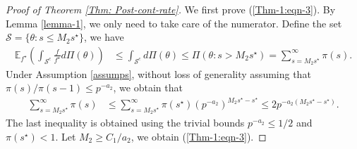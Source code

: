 \documentclass[pdftex, noinfoline, letter]{imsart}
\theoremstyle{plain}
\begin{document}
\begin{proof}[Proof of Theorem \ref{Thm: Post-cont-rate}]
We first prove (\ref{Thm-1:eqn-3}).
By Lemma \ref{lemma-1}, we only need to take care of the numerator.
Define the set $\mathcal{S} = \{\theta: s \leq M_2s^\star\}$,
we have
\begin{align*}
    \mathbb{E}_{f^\star} \left(
        \int_{\mathcal{S}^c} \frac{f}{f^\star} d\Pi(\theta)
    \right) 
    & \leq \int_{\mathcal{S}^c} d\Pi(\theta)
    \leq \Pi(\theta: s > M_2s^\star)
    = \sum_{s = M_2s^\star}^\infty \pi(s). 
\end{align*}
Under Assumption \ref{assumps},
without loss of generality assuming that $\pi(s)/\pi(s-1) \leq p^{- a_2}$, we obtain that
\begin{align*}
    \sum_{s = M_2s^\star}^\infty \pi(s)
    & \leq 
    \sum_{s = M_2 s^\star}^\infty \pi(s^\star) 
    (p^{-a_2})^{M_2s^\star - s^\star}
    \leq 
    2 p^{-a_2(M_2s^\star - s^\star)}.
\end{align*}
The last inequality is obtained using the trivial bounds
$p^{-a_2} \leq 1/2$ and $\pi(s^\star) < 1$.
Let $M_2 \geq C_1/a_2$, 
we obtain (\ref{Thm-1:eqn-3}).



\end{proof}
\end{document}
